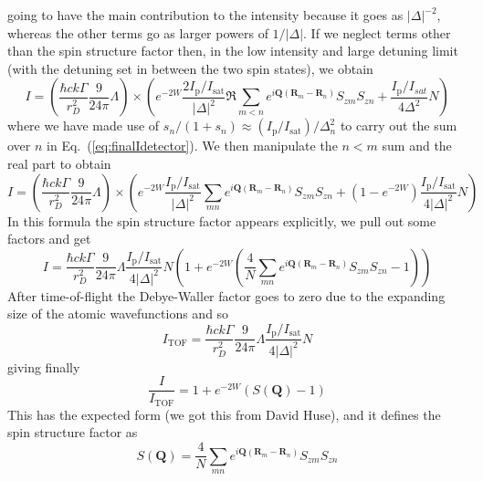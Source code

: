 \documentclass[11pt,letter]{article}
\newcommand{\bv}[1]{\ensuremath{\bm{#1}}}
\begin{document}
going to have the main contribution to the intensity because it goes as $
|\Delta|^{-2} $, whereas the other terms go as larger powers of $1/|\Delta|$.  
If we neglect terms other than the spin structure factor then,  in the low intensity and large detuning limit (with the detuning set in between the two spin states), we obtain 
\begin{equation}
 I  =
 \left( 
 \frac{\hbar c k \Gamma}{r_{D}^{2}}  
     \frac{9}{24\pi} \Lambda 
  \right) \times 
  \left(
    e^{-2W} \frac{2I_{\mathrm{p}}/I_{\mathrm{sat}}}{ |\Delta|^{2} }  \Re \sum_{m<n}  
      e^{ i \bv{Q}( \bv{R}_{m} - \bv{R}_{n} ) } 
      S_{zm}S_{zn}  
  +  \frac{I_{\mathrm{p}}/I_{sat}}{ 4 \Delta^{2} } N
  \right)
\end{equation}
where we have made use of $s_{n}/(1+s_{n}) \approx (I_{\mathrm{p}}/I_{\mathrm{sat}})/ \Delta_{n}^{2}$ to carry out the sum over $n$ in Eq.~(\ref{eq:finalIdetector}).  We then manipulate the $n<m$ sum and the real part to obtain
\begin{equation}
 I  =
 \left( 
 \frac{\hbar c k \Gamma}{r_{D}^{2}}  
     \frac{9}{24\pi} \Lambda 
  \right) \times 
  \left(
    e^{-2W} \frac{I_{\mathrm{p}}/I_{\mathrm{sat}}}{ |\Delta|^{2} }  \sum_{m n}  
      e^{ i \bv{Q}( \bv{R}_{m} - \bv{R}_{n} ) } 
      S_{zm}S_{zn}  
  + (1- e^{-2W}) \frac{I_{\mathrm{p}}/I_{\mathrm{sat}}}{ 4|\Delta|^{2} }  N
  \right)
\end{equation}
In this formula the spin structure factor appears explicitly, we pull out some factors and get  
\begin{equation}
 I  =
 \frac{\hbar c k \Gamma}{r_{D}^{2}}  
     \frac{9}{24\pi} \Lambda
 \frac{I_{\mathrm{p}}/I_{\mathrm{sat}}}{ 4|\Delta|^{2} }  N
  \left(
   1 + 
    e^{-2W} \left( \frac{4}{ N }  \sum_{m n}  
      e^{ i \bv{Q}( \bv{R}_{m} - \bv{R}_{n} ) } 
      S_{zm}S_{zn}  - 1 \right )
     \right)
\end{equation}
After time-of-flight the Debye-Waller factor goes to zero due to the expanding size of the atomic wavefunctions and so  
\begin{equation}
 I_{\mathrm{TOF}} =
 \frac{\hbar c k \Gamma}{r_{D}^{2}}  
     \frac{9}{24\pi} \Lambda
 \frac{I_{\mathrm{p}}/I_{\mathrm{sat}}}{ 4|\Delta|^{2} }  N
\end{equation}
giving finally 
\begin{equation}
 \frac{I}{I_{\mathrm{TOF}}} = 1 +  e^{-2W}( S(\bv{Q}) - 1 ) 
\end{equation}
This has the expected form (we got this from David Huse), and it defines the spin structure factor as 
\begin{equation}
    S(\bv{Q}) =  \frac{4}{ N }  \sum_{m n}  
      e^{ i \bv{Q}( \bv{R}_{m} - \bv{R}_{n} ) } 
      S_{zm}S_{zn}  
\end{equation}
\end{document}
